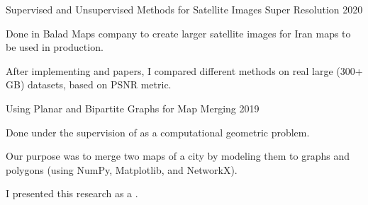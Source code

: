 \begin{cvprojects}
  \cvproject
    {Supervised and Unsupervised Methods for Satellite Images Super Resolution} %
    {} %
    {} %
    {2020} %
    {
      \begin{cvitems} %
        \item {Done in Balad Maps company to create larger satellite images for Iran maps to be used in production.}
        \item {After implementing  and  papers, I compared different methods on real large (300+ GB) datasets, based on PSNR metric.}
      \end{cvitems}
    }

  \cvproject
    {Using Planar and Bipartite Graphs for Map Merging} %
    {} %
    {} %
    {2019} %
    {
      \begin{cvitems} %
        \item {Done under the supervision of  as a computational geometric problem.}
        \item {Our purpose was to merge two maps of a city by modeling them to graphs and polygons (using NumPy, Matplotlib, and NetworkX).}
        \item {I presented this research as a .}
      \end{cvitems}
    }

\end{cvprojects}
